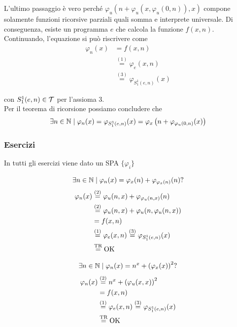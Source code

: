 L'ultimo passaggio è vero perché $\varphi_u \left(n + \varphi_u \left(x, \varphi_u (0,n)\right), x\right)$ compone solamente funzioni ricorsive parziali quali somma e interprete universale. Di conseguenza, esiste un programma $e$ che calcola la funzione $f(x,n)$.\\

Continuando, l'equazione si può riscrivere come
\begin{align*}
	\varphi_n (x) & = f(x,n) \\
	& \stackrel{(1)}{=} \varphi_e (x,n) \\
	& \stackrel{(3)}{=} \varphi_{S_1^1 (e,n)} (x) 
\end{align*}

con $S_1^1 (e,n) \in \mathcal{T}$ per l'assioma 3.\\

Per il teorema di ricorsione possiamo concludere che
$$ \exists n \in \mathbb{N} \mid \varphi_n (x) = \varphi_{S^1_1 (e,n)} (x) = \varphi_x \left(n + \varphi_{\varphi_u (0,n)} (x)\right) $$

\subsubsection{Esercizi}

In tutti gli esercizi viene dato un SPA $\{\varphi_i\}$

$$ \exists n \in \mathbb{N} \mid \varphi_n (x) = \varphi_x (n) + \varphi_{\varphi_x (n)} (n)? $$
\begin{align*}
	\varphi_n (x) & \stackrel{(2)}{=} \varphi_u (n,x) + \varphi_{\varphi_u (n,x)} (n) \\
	& \stackrel{(2)}{=} \varphi_u (n,x) + \varphi_u (n, \varphi_u (n,x)) \\
	& = f(x,n) \\
	& \stackrel{(1)}{=} \varphi_e (x,n) \stackrel{(3)}{=} \varphi_{S^1_1 (e,n)} (x) \\
	& \stackrel{\text{TR}}{=} \text{OK}
\end{align*}

$$ \exists n \in \mathbb{N} \mid \varphi_n (x) = n^x + \left(\varphi_x (x)\right)^2 ? $$
\begin{align*}
	\varphi_n (x) & \stackrel{(2)}{=} n^x + \left(\varphi_u (x,x)\right)^2 \\
	& = f(x,n) \\
	& \stackrel{(1)}{=} \varphi_e (x,n) \stackrel{(3)}{=} \varphi_{S^1_1 (e,n)} (x) \\
	& \stackrel{\text{TR}}{=} \text{OK} 
\end{align*}

